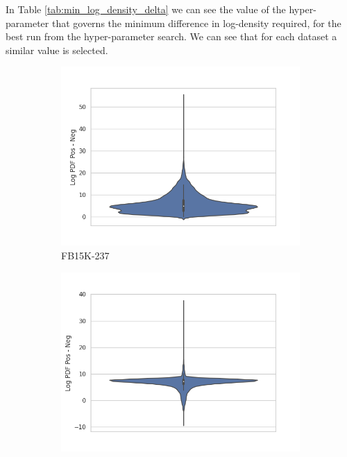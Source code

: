 In Table \ref{tab:min_log_density_delta} we can see the value of the hyper-parameter that governs the minimum difference in log-density required, for the best run from the hyper-parameter search.
We can see that for each dataset a similar value is selected. 
\begin{figure}
    \centering
    \begin{subfigure}[b]{0.50\columnwidth}
        \includegraphics[trim=0cm 11mm 1cm 0pt, clip]{figures/analysis/embedprior/fb15k237_analysis_prior_lpdf_diff.png}
        \caption{FB15K-237}
    \end{subfigure}
    \begin{subfigure}[b]{0.492\columnwidth}
        \includegraphics[trim=0cm 11mm 1cm 0pt, clip]{figures/analysis/embedprior/wnrr_analysis_prior_lpdf_diff.png}

\end{subfigure}
\end{figure}
